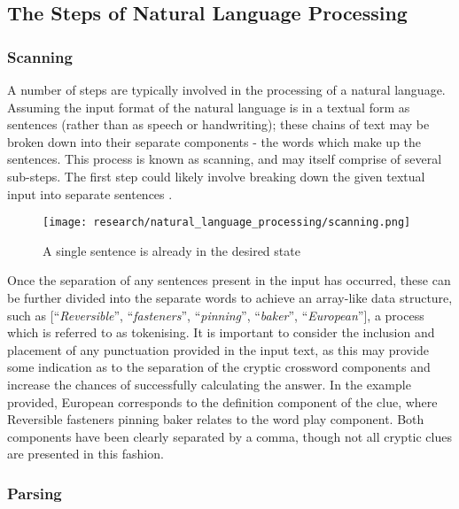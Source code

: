 \newpage
\subsection{The Steps of Natural Language Processing}
\subsubsection{Scanning}

A number of steps are typically involved in the processing of a natural language. Assuming the input format of the natural language is in a textual form as sentences (rather than as speech or handwriting); these chains of text may be broken down into their separate components - the words which make up the sentences. This process is known as scanning, and may itself comprise of several sub-steps. The first step could likely involve breaking down the given textual input into separate sentences \citep{apache13}.

\begin{figure}[!ht]
	\texttt{[image: research/natural\_language\_processing/scanning.png]}
	\caption{A single sentence is already in the desired state}
\end{figure}

Once the separation of any sentences present in the input has occurred, these can be further divided into the separate words to achieve an array-like data structure, such as [“\emph{Reversible}”, “\emph{fasteners}”, “\emph{pinning}”, “\emph{baker}”, “\emph{European}”], a process which is referred to as tokenising. It is important to consider the inclusion and placement of any punctuation provided in the input text, as this may provide some indication as to the separation of the cryptic crossword components  and increase the chances of successfully calculating the answer. In the example provided, European corresponds to the definition component of the clue, where Reversible fasteners pinning baker relates to the word play component. Both components have been clearly separated by a comma, though not all cryptic clues are presented in this fashion.

\subsubsection{Parsing}

